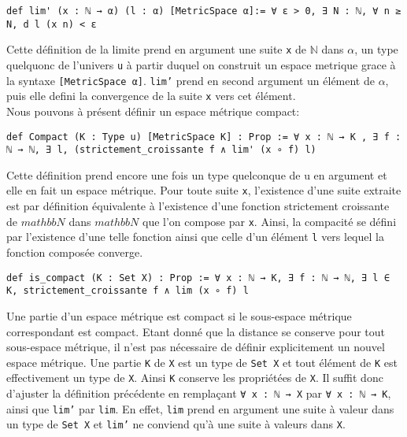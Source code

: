 \documentclass[a4paper, 12pt]{article}
\newcommand{\lean}[1]{\texttt{#1}}
\begin{document}
\begin{verbatim}
def lim' (x : ℕ → α) (l : α) [MetricSpace α]:= ∀ ε > 0, ∃ N : ℕ, ∀ n ≥ N, d l (x n) < ε
\end{verbatim}

Cette définition de la limite prend en argument une suite \lean{x} de $\mathbb{N}$ dans $\alpha$, un type quelquonc de l'univers \lean{u} à partir duquel on construit un espace metrique grace à la syntaxe \lean{[MetricSpace α]}. \lean{lim'} prend en second argument un élément de $\alpha$, puis elle defini la convergence de la suite \lean{x} vers cet élément.\\

Nous pouvons à présent définir un espace métrique compact:

\begin{verbatim}
def Compact (K : Type u) [MetricSpace K] : Prop := ∀ x : ℕ → K , ∃ f : ℕ → ℕ, ∃ l, (strictement_croissante f ∧ lim' (x ∘ f) l)
\end{verbatim}

Cette définition prend encore une fois un type quelconque de u en argument et elle en fait un espace métrique. Pour toute suite \lean{x}, l'existence d'une suite extraite est par définition équivalente à l'existence d'une fonction strictement croissante de $mathbb{N}$ dans $mathbb{N}$ que l'on compose par \lean{x}. Ainsi, la compacité se défini par l'existence d'une telle fonction ainsi que celle d'un élément \lean{l} vers lequel la fonction composée converge.

\begin{verbatim}
def is_compact (K : Set X) : Prop := ∀ x : ℕ → K, ∃ f : ℕ → ℕ, ∃ l ∈ K, strictement_croissante f ∧ lim (x ∘ f) l
\end{verbatim}

Une partie d'un espace métrique est compact si le sous-espace métrique correspondant est compact. Etant donné que la distance se conserve pour tout sous-espace métrique, il n'est pas nécessaire de définir explicitement un nouvel espace métrique. Une partie \lean{K} de \lean{X} est un type de \lean{Set X} et tout élément de \lean{K} est effectivement un type de \lean{X}. Ainsi \lean{K} conserve les propriétées de \lean{X}. Il suffit donc d'ajuster la définition précédente en remplaçant \lean{∀ x : ℕ → X} par \lean{∀ x : ℕ → K}, ainsi que \lean{lim'} par \lean{lim}. En effet, \lean{lim} prend en argument une suite à valeur dans un type de \lean{Set X} et \lean{lim'} ne conviend qu'à une suite à valeurs dans \lean{X}.
\end{document}
